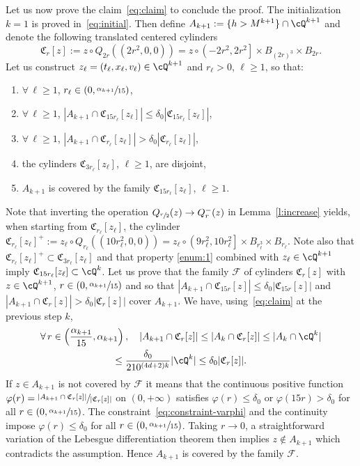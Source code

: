 Let us now prove the claim~\eqref{eq:claim} to conclude the
proof. The initialization $k=1$ is proved
in~\eqref{eq:initial}. Then define
$A_{k+1} := \{ h > M^{k+1} \} \cap \cQ^{k+1}$ and denote
the following translated centered cylinders
\[
\mathfrak C_{r}[z] :=z\circ Q_{2r}((2r^2,0,0))= z \circ
\left(-2r^2,2r^2\right]\times B_{(2r)^3} \times B_{2r}.
\]
Let us
construct $z_\ell=(t_\ell,x_\ell,v_\ell)\in \cQ^{k+1}$ and
$r_\ell >0$, $\ell \ge 1$, so that:
\begin{enumerate}
\item\label{enum:1} $\forall \, \ell \ge 1$, $r_\ell \in (0,\sfrac{\alpha_{k+1}}{15})$,
\item\label{enum:2} $\forall \, \ell \ge 1$,
$|A_{k+1} \cap \mathfrak C_{15r_\ell}[z_\ell]| \le \delta_0
|\mathfrak C_{15 r_\ell}[z_\ell]|$,
\item\label{enum:3} $\forall \, \ell \ge 1$,
$|A_{k+1} \cap \mathfrak C_{r_\ell}[z_\ell]| > \delta_0
|\mathfrak C_{r_\ell}[z_\ell]|$,
\item\label{enum:4} the cylinders $\mathfrak C_{3r_\ell}[z_\ell]$, $\ell \ge
1$, are disjoint,
\item\label{enum:5} $A_{k+1}$ is covered by the family $\mathfrak
C_{15r_\ell}[z_\ell]$, $\ell \ge 1$.
\end{enumerate}
Note that inverting the operation
$Q_{\sfrac{r}{2}}(z) \to Q_{r}^-(z)$ in Lemma~\ref{l:increase}
yields, when starting from $\mathfrak C_{r_\ell}[z_\ell]$, the
cylinder
$\mathfrak C_{r_\ell}[z_\ell]^+ :=z_\ell\circ
Q_{r_\ell}((10r_\ell^2,0,0))= z_\ell \circ
\left(9r_\ell^2,10r_\ell^2\right]\times B_{r_\ell^3} \times
B_{r_\ell}$. Note also that
$\mathfrak C_{r_\ell}[z_\ell]^+ \subset \mathfrak C_{3
r_\ell}[z_\ell]$ and that property \eqref{enum:1} combined with
$z_\ell \in \cQ^{k+1}$ imply
$\mathfrak C_{15r_\ell}[z_\ell] \subset \cQ^k$. Let us prove
that the family $\mathcal F$ of cylinders $\mathfrak C_{r}[z]$
with $z \in \cQ^{k+1}$, $r \in (0,\sfrac{\alpha_{k+1}}{15})$ and
so that
$|A_{k+1} \cap \mathfrak C_{15r}[z]| \le \delta_0 |\mathfrak
C_{15 r}[z]|$ and
$|A_{k+1} \cap \mathfrak C_{r}[z]| > \delta_0 |\mathfrak
C_{r}[z]|$ cover $A_{k+1}$. We have, using~\eqref{eq:claim} at
the previous step $k$,
\begin{multline}
\label{eq:constraint-varphi}
\forall \, r \in
\left(\frac{\alpha_{k+1}}{15},\alpha_{k+1}\right), \quad
|A_{k+1} \cap \mathfrak C_{r}[z]| \le |A_{k} \cap \mathfrak
C_{r}[z]| \le |A_{k} \cap \cQ^k| \\
\le \frac{\delta_0}{210^{(4d+2)k}} |\cQ^k| \le \delta_0
|\mathfrak C_{r}[z]|.
\end{multline}
If $z \in A_{k+1}$ is not covered by $\mathcal F$ it means that
the continuous positive function
$\varphi(r) = \sfrac{|A_{k+1} \cap \mathfrak C_{r}[z]|}{|\mathfrak
C_{r}[z]|}$ on $(0,+\infty)$ satisfies $\varphi(r) \le \delta_0$
or $\varphi(15r) > \delta_0$ for all
$r \in (0,\sfrac{\alpha_{k+1}}{15})$. The
constraint~\eqref{eq:constraint-varphi} and the continuity impose
$\varphi(r) \le \delta_0$ for all
$r \in\nobreak (0,\sfrac{\alpha_{k+1}}{15})$. Taking $r \to 0$, a
straightforward variation of the Lebesgue differentiation theorem
then implies $z\notin A_{k+1}$ which contradicts the
assumption. Hence $A_{k+1}$ is covered by the family $\mathcal
F$.

